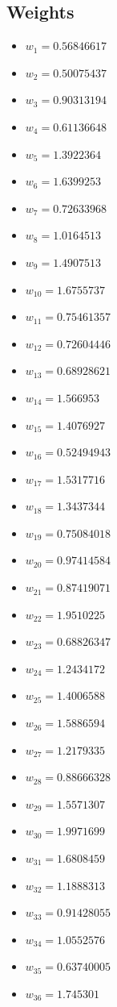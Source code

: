 \documentclass[11pt]{article}
\begin{document}
\subsection*{Weights}
\begin{itemize}
\item $w_{1} = 0.56846617$
\item $w_{2} = 0.50075437$
\item $w_{3} = 0.90313194$
\item $w_{4} = 0.61136648$
\item $w_{5} = 1.3922364$
\item $w_{6} = 1.6399253$
\item $w_{7} = 0.72633968$
\item $w_{8} = 1.0164513$
\item $w_{9} = 1.4907513$
\item $w_{10} = 1.6755737$
\item $w_{11} = 0.75461357$
\item $w_{12} = 0.72604446$
\item $w_{13} = 0.68928621$
\item $w_{14} = 1.566953$
\item $w_{15} = 1.4076927$
\item $w_{16} = 0.52494943$
\item $w_{17} = 1.5317716$
\item $w_{18} = 1.3437344$
\item $w_{19} = 0.75084018$
\item $w_{20} = 0.97414584$
\item $w_{21} = 0.87419071$
\item $w_{22} = 1.9510225$
\item $w_{23} = 0.68826347$
\item $w_{24} = 1.2434172$
\item $w_{25} = 1.4006588$
\item $w_{26} = 1.5886594$
\item $w_{27} = 1.2179335$
\item $w_{28} = 0.88666328$
\item $w_{29} = 1.5571307$
\item $w_{30} = 1.9971699$
\item $w_{31} = 1.6808459$
\item $w_{32} = 1.1888313$
\item $w_{33} = 0.91428055$
\item $w_{34} = 1.0552576$
\item $w_{35} = 0.63740005$
\item $w_{36} = 1.745301$

\end{itemize}
\end{document}

